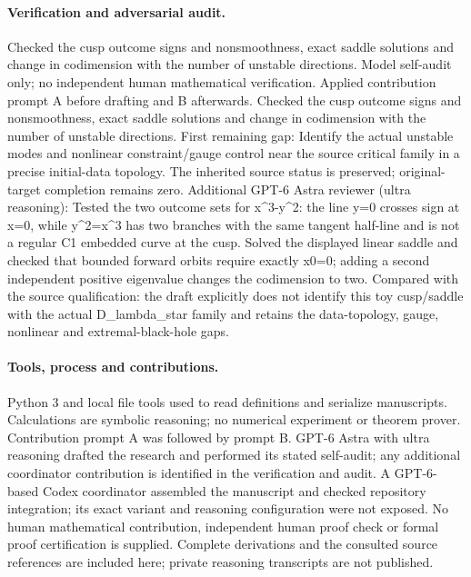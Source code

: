 \documentclass[11pt]{article}
\begin{document}
\paragraph{Verification and adversarial audit.}
Checked the cusp outcome signs and nonsmoothness, exact saddle solutions and change in codimension with the number of unstable directions. Model self-audit only; no independent human mathematical verification. Applied contribution prompt A before drafting and B afterwards. Checked the cusp outcome signs and nonsmoothness, exact saddle solutions and change in codimension with the number of unstable directions. First remaining gap: Identify the actual unstable modes and nonlinear constraint/gauge control near the source critical family in a precise initial-data topology. The inherited source status is preserved; original-target completion remains zero. Additional GPT-6 Astra reviewer (ultra reasoning): Tested the two outcome sets for x\textasciicircum{}3-y\textasciicircum{}2: the line y=0 crosses sign at x=0, while y\textasciicircum{}2=x\textasciicircum{}3 has two branches with the same tangent half-line and is not a regular C1 embedded curve at the cusp. Solved the displayed linear saddle and checked that bounded forward orbits require exactly x0=0; adding a second independent positive eigenvalue changes the codimension to two. Compared with the source qualification: the draft explicitly does not identify this toy cusp/saddle with the actual D\_lambda\_star family and retains the data-topology, gauge, nonlinear and extremal-black-hole gaps.

\paragraph{Tools, process and contributions.}
Python 3 and local file tools used to read definitions and serialize manuscripts. Calculations are symbolic reasoning; no numerical experiment or theorem prover. Contribution prompt A was followed by prompt B. GPT-6 Astra with ultra reasoning drafted the research and performed its stated self-audit; any additional coordinator contribution is identified in the verification and audit. A GPT-6-based Codex coordinator assembled the manuscript and checked repository integration; its exact variant and reasoning configuration were not exposed. No human mathematical contribution, independent human proof check or formal proof certification is supplied. Complete derivations and the consulted source references are included here; private reasoning transcripts are not published.
\end{document}
